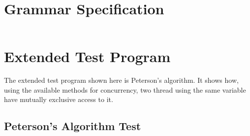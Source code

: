 \documentclass[twoside]{report}
\begin{document}
\begin{appendices}
\label{appendices}


\chapter{Grammar Specification}
\label{grammar_specification}
\begin{landscape}
\inputminted[firstline=66, lastline=138, tabsize=4]{haskell}{../Grammar.hs}
\end{landscape}


\chapter{Extended Test Program}
\label{extended_test_program}
The extended test program shown here is Peterson's algorithm. It shows how, using the available methods for concurrency, two thread using the same variable have mutually exclusive access to it.

\section{Peterson's Algorithm Test}
\inputminted[tabsize=4]{text}{../test/peterson.shl}


\end{appendices}
\end{document}
